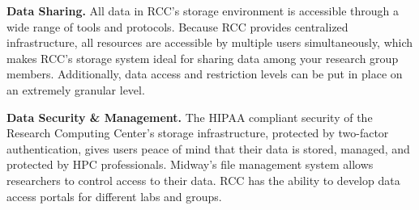 \textbf{Data Sharing.} All data in RCC's storage environment is accessible through a wide range of tools and protocols. Because RCC provides centralized infrastructure, all resources are accessible by multiple users simultaneously, which makes RCC’s storage system ideal for sharing data among your research group members. Additionally, data access and restriction levels can be put in place on an extremely granular level.

\textbf{Data Security \& Management.} The HIPAA compliant security of the Research Computing Center’s storage infrastructure, protected by two-factor authentication,  gives users peace of mind that their data is stored, managed, and protected by HPC professionals. Midway's file management system allows researchers to control access to their data. RCC has the ability to develop data access portals for different labs and groups.

